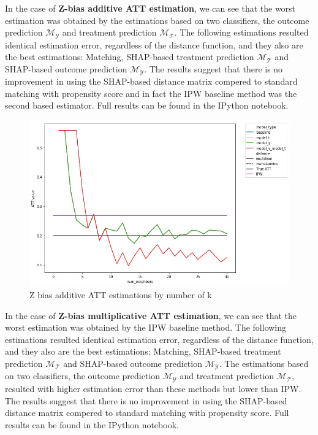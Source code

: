 \documentclass{article}
\begin{document}
In the case of \textbf{Z-bias additive ATT estimation}, we can see that the worst estimation was obtained by the estimations based on two classifiers, the outcome prediction $\mathcal{M_Y}$ and treatment prediction $\mathcal{M_T}$.
The following estimations resulted identical estimation error, regardless of the distance function, and they also are the best estimations: Matching, SHAP-based  treatment prediction $\mathcal{M_T}$ and SHAP-based outcome prediction $\mathcal{M_Y}$. 
The results suggest that there is no improvement in using the SHAP-based distance matrix compered to standard matching with propensity score and in fact the IPW baseline method was the second based estimator. 
Full results can be found in the IPython notebook. 

\begin{figure}[H]
    \centering
    \includegraphics[width=\textwidth]{Paper/images/z_bias_additive_ATT_estimations_by_k_neighbors.png}
    \caption{Z bias additive ATT estimations by number of k}
    \label{fig:z_bias_additive}
\end{figure}


In the case of \textbf{Z-bias multiplicative ATT estimation}, we can see that the worst estimation was obtained by the IPW baseline method. 
The following estimations resulted identical estimation error, regardless of the distance function, and they also are the best estimations: Matching, SHAP-based  treatment prediction $\mathcal{M_T}$ and SHAP-based outcome prediction $\mathcal{M_Y}$. 
The estimations based on two classifiers, the outcome prediction $\mathcal{M_Y}$ and treatment prediction $\mathcal{M_T}$, resulted with higher estimation error than these methods but lower than IPW. 
The results suggest that there is no improvement in using the SHAP-based distance matrix compered to standard matching with propensity score. Full results can be found in the IPython notebook. 
\end{document}
